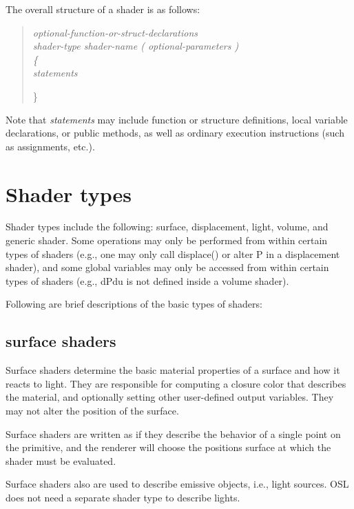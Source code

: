 \documentclass[11pt,letterpaper]{book}
\def\P{{\cf P}\xspace}
\def\colorclosure{{\cf closure color}\xspace}
\begin{document}
The overall structure of a shader is as follows:
\medskip

\begin{quote}
\em
optional-function-or-struct-declarations \\

shader-type shader-name {\cf (} optional-parameters {\cf )} \\
\rm
{\cf \{ } \\
\em
\spc statements

{\cf \} }
\end{quote}

Note that \emph{statements} may include function or structure
definitions, local variable declarations, or public methods, as well as
ordinary execution instructions (such as assignments, etc.).

\section{Shader types}
\label{sec:shadertypes}
 

Shader types include the following: {\cf surface}, {\cf displacement},
{\cf light}, {\cf volume}, and generic {\cf shader}.  Some operations
may only be performed from within certain types of shaders (e.g., one
may only call {\cf displace()} or alter \P in a displacement shader),
and some global variables may only be accessed from within certain types
of shaders (e.g., {\cf dPdu} is not defined inside a volume shader).

Following are brief descriptions of the basic types of shaders:


\subsection*{{\cf surface} shaders}

Surface shaders determine the basic material properties of a surface and
how it reacts to light.  They are responsible for computing a
\colorclosure that describes the material, and optionally setting
other user-defined output variables.  They may not alter
the position of the surface.

Surface shaders are written as if they describe the behavior of a single
point on the primitive, and the renderer will choose the positions
surface at which the shader must be evaluated.

Surface shaders also are used to describe emissive objects, i.e., light
sources.  OSL does not need a separate shader type to describe lights.
\end{document}
